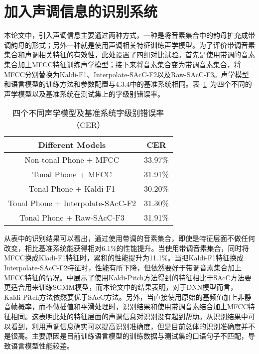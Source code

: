 \section{加入声调信息的识别系统}
本论文中，引入声调信息主要通过两种方式，一种是将音素集合中的韵母扩充成带调韵母的形式；另外一种就是使用声调相关特征训练声学模型。为了评价带调音素集合和声调相关特征的有效性，此处设置了四组对比试验。首先是使用带调的音素集合加上MFCC特征训练声学模型；接下来将音素集合变为带调音素集合，将MFCC分别替换为Kaldi-F1、Interpolate-SAcC-F2以及Raw-SAcC-F3。声学模型和语言模型的训练方法和参数配置与4.3.4中的基准系统相同。表~\ref{tab:table4}~为四个不同的声学模型以及基准系统在测试集上的字级别错误率。
\begin{table}[htbp]
\caption{四个不同声学模型及基准系统字级别错误率（CER）}\label{tab:table4}
\vspace{0.5em}\centering\wuhao
\begin{tabular}{cc}
\toprule[1.5pt]
Different Models & CER \\
\midrule[1pt]
Non-tonal Phone + MFCC & 33.97\% \\
Tonal Phone + MFCC & 31.91\% \\
Tonal Phone + Kaldi-F1 & 30.20\% \\
Tonal Phone + Interpolate-SAcC-F2 & 31.30\% \\
Tonal Phone + Raw-SAcC-F3 & 31.91\% \\
\bottomrule[1.5pt]
\end{tabular}
\vspace{\baselineskip}
\end{table}

从表中的识别结果可以看出，通过使用带调的音素集合，即使是特征层面不做任何改变，相比基准系统能获得相对6.1\%的性能提升。当使用带调音素集合，同时将MFCC换成Kladi-F1特征时，累积的性能提升为11.1\%。当把Kaldi-F1特征换成Interpolate-SAcC-F2特征时，性能有所下降，但依然要好于带调音素集合加上MFCC特征的情况。\cite{ghahremani2014pitch}中展示了使用Kaldi-Pitch方法得到的特征相比于SAcC方法要更适合用来训练SGMM模型，而本论文中的结果表明，对于DNN模型而言，Kaldi-Pitch方法依然要优于SAcC方法。另外，当直接使用原始的基频值加上非静音帧概率，而不做插值和平滑处理时，识别结果和使用带调音素结合加上MFCC特征相同。这表明此处的特征层面的声调信息对识别没有起到帮助。从识别结果中可以看到，利用声调信息确实可以提高识别准确度，但是目前总体的识别准确度并不是很高。主要原因是目前训练语言模型的训练数据与测试集的口语句子不匹配，导致语言模型性能较差。
